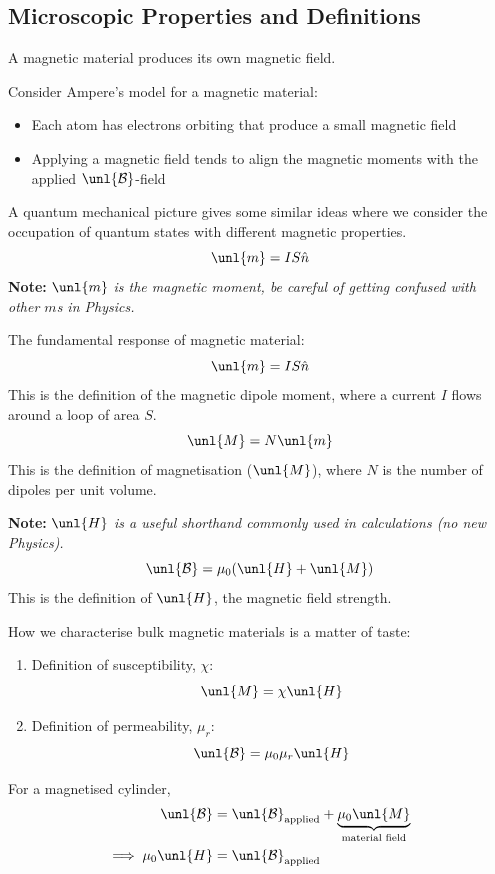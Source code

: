 \documentclass[a4paper, 11pt, normalem]{report}
\newcommand\B{\mathcal{B}}
\newcommand\uB{\unl{\B}}
\newcommand\hn{\hat{n}}
\begin{document}
\subsection{Microscopic Properties and Definitions}

A magnetic material produces its own magnetic field.

Consider Ampere's model for a magnetic material:
\begin{itemize}
    \item Each atom has electrons orbiting that produce a small magnetic field
    \item Applying a magnetic field tends to align the magnetic moments with the applied $\uB$-field
\end{itemize}
A quantum mechanical picture gives some similar ideas where we consider the occupation of quantum states with different magnetic properties.
\begin{equation*}
    \unl{m} = IS\hn
\end{equation*}
\textbf{Note:} \textit{$\unl{m}$ is the magnetic moment, be careful of getting confused with other $m$s in Physics.}

The fundamental response of magnetic material:
\begin{equation*}
    \unl{m} = IS\hn
\end{equation*}
This is the definition of the magnetic dipole moment, where a current $I$ flows around a loop of area $S$.
\begin{equation*}
    \unl{M} = N\unl{m}
\end{equation*}
This is the definition of magnetisation ($\unl{M}$), where $N$ is the number of dipoles per unit volume.

\textbf{Note:} \textit{$\unl{H}$ is a useful shorthand commonly used in calculations (no new Physics).}
\begin{equation*}
    \uB = \mu_0(\unl{H} + \unl{M})
\end{equation*}
This is the definition of $\unl{H}$, the magnetic field strength.

How we characterise bulk magnetic materials is a matter of taste:
\begin{enumerate}
    \item Definition of susceptibility, $\chi$:
    \begin{equation*}
        \unl{M} = \chi \unl{H}
    \end{equation*}
    \item Definition of permeability, $\mu_r$:
    \begin{equation*}
        \uB = \mu_0\mu_r\unl{H}
    \end{equation*}
\end{enumerate}
For a magnetised cylinder,
\begin{align*}
    \uB &= \uB_{\text{applied}} + \underbrace{\mu_0\unl{M}}_{\text{material field}} \\
    \implies \mu_0\unl{H} &= \uB_{\text{applied}}
\end{align*}
\end{document}
